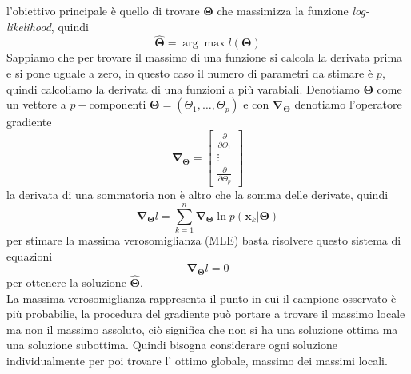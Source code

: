 l'obiettivo principale è quello di trovare $\mathbf{\Theta}$ che massimizza la funzione \emph{log-likelihood}, quindi
\begin{equation}
\mathbf{\hat{\Theta}} = \arg \max l(\mathbf{\Theta})
\end{equation}
Sappiamo che per trovare il massimo di una funzione si calcola la derivata prima e si pone uguale a zero, in questo caso il numero di parametri da stimare è $p$, quindi calcoliamo la derivata di una funzioni a più varabiali. Denotiamo $\mathbf{\Theta}$ come un vettore a $p-$componenti $\mathbf{\Theta} = (\Theta_1, \dots, \Theta_p)$ e con $\mathbf{\nabla_\Theta}$ denotiamo l'operatore gradiente
\begin{equation}\label{gradiente}
    \mathbf{\nabla_\Theta} =
    \begin{bmatrix}
    \frac{\partial}{\partial \Theta_1} \\
    \vdots \\
    \frac{\partial}{\partial \Theta_p}
    \end{bmatrix}
\end{equation}
la derivata di una sommatoria non è altro che la somma delle derivate, quindi
\begin{equation}\label{6}
\mathbf{\nabla_\Theta}l = \sum_{k=1}^n \mathbf{\nabla_\Theta} \ln p(\mathbf{x}_k| \mathbf{\Theta})
\end{equation}
per stimare la massima verosomiglianza (MLE) basta risolvere questo sistema di equazioni
\begin{equation}\label{7}
\mathbf{\nabla_\Theta}l = 0
\end{equation}
per ottenere la soluzione $\mathbf{\hat{\Theta}}$.\\

\noindent La massima verosomiglianza rappresenta il punto in cui il campione osservato è più probabilie, la procedura del gradiente può portare a trovare il massimo locale ma non il massimo assoluto, ciò significa che non si ha una soluzione ottima ma una soluzione subottima. Quindi bisogna considerare ogni soluzione individualmente per poi trovare l' ottimo globale, massimo dei massimi locali. 

